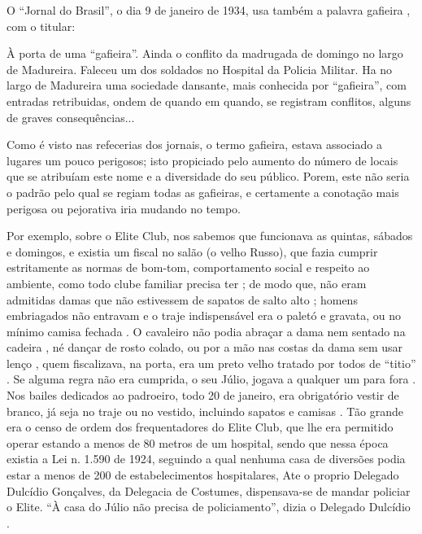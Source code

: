 O ``Jornal do Brasil'', o dia 9 de janeiro de 1934, 
usa também a palavra gafieira \cite[pp. 11]{gafieirajournalbrasil1}, com o titular:
\begin{tcolorbox}[breakable,colback=lowgray,colframe=lowgray]%
À porta de uma ``gafieira''.
Ainda o conflito da madrugada de domingo no largo de Madureira.
Faleceu um dos soldados no Hospital da Policia Militar. 
Ha no largo de Madureira uma sociedade dansante, mais conhecida por ``gafieira'', 
com entradas retribuidas, ondem de quando em quando, se registram conflitos, 
alguns de graves consequências...
\end{tcolorbox} 
Como é visto nas refecerias dos jornais, 
o termo gafieira, estava associado a lugares um pouco perigosos;
isto propiciado pelo aumento do número de locais que se atribuíam este nome e a diversidade do seu público.
Porem, este não seria o padrão pelo qual se regiam todas as gafieiras, 
e certamente a conotação mais perigosa ou pejorativa iria mudando no tempo. 


Por exemplo, sobre o Elite Club,  nos sabemos que funcionava as quintas, sábados e domingos,
e existia um fiscal no salão (o velho Russo)\cite[pp. 37]{gafieirajournalmanchete}, 
que fazia cumprir estritamente as normas de bom-tom, comportamento social e respeito ao ambiente, como todo clube familiar precisa ter \cite[pp. 12]{respeitojournalbrasil1}; de modo que, 
não eram admitidas damas que não estivessem de sapatos de salto alto \cite[pp. 37]{gafieirajournalmanchete};
homens embriagados não entravam e o traje indispensável era o paletó e gravata, 
ou no mínimo camisa fechada \cite{entrevistajuliojournalbrasil1}.
O cavaleiro não podia abraçar a dama nem sentado na cadeira \cite{entrevistajuliojournalbrasil1},
né dançar de rosto colado, ou por a mão nas costas da dama sem usar lenço \cite[pp. 10]{simoesjournalbrasil1}, 
quem fiscalizava, na porta, era um preto velho tratado por todos de ``titio''  \cite[pp. 37]{gafieirajournalmanchete}.
Se alguma regra não era cumprida, o seu Júlio, jogava a qualquer um para fora \cite{entrevistajuliojournalbrasil1}.
Nos bailes dedicados ao padroeiro, todo 20 de janeiro, era obrigatório vestir de branco,
já seja no traje ou no vestido, incluindo sapatos e camisas \cite[pp. 37]{gafieirajournalmanchete}.
Tão grande era o censo de ordem dos frequentadores do Elite Club, 
que lhe era permitido operar estando a menos de 80 metros de um hospital,
sendo que nessa época existia a Lei n. 1.590 de 1924, 
seguindo a qual nenhuma casa de diversões podia estar a menos de 200 de estabelecimentos hospitalares,
Ate o proprio Delegado Dulcídio Gonçalves, da Delegacia de Costumes,
dispensava-se de mandar policiar o Elite.
``À casa do Júlio não precisa de policiamento'', dizia o Delegado Dulcídio
\cite[pp. 5]{simoesjournalalutademocratica1}.


